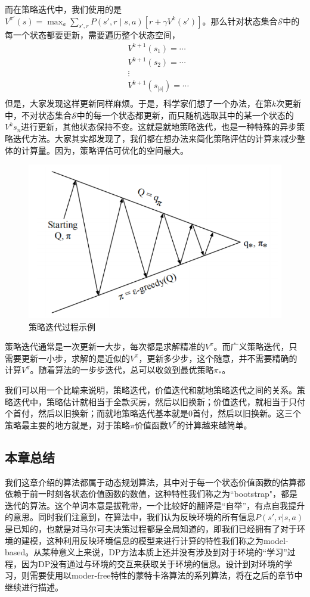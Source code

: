 \documentclass[a4paper]{article}
\begin{document}
而在策略迭代中，我们使用的是$V^{\pi'}(s) = \max_a \sum_{s',r} P(s',r\mid s,a)[r+\gamma V^{k}(s')]$。那么针对状态集合$\mathcal{S}$中的每一个状态都要更新，需要遍历整个状态空间，
\begin{equation}
    \begin{aligned}
    & V^{k+1}(s_1) = \cdots \\
    & V^{k+1}(s_2) = \cdots \\
    & \vdots \\
    & V^{k+1}(s_{|s|}) = \cdots \\
    \end{aligned}
\end{equation}
但是，大家发现这样更新同样麻烦。于是，科学家们想了一个办法，在第$k$次更新中，不对状态集合$\mathcal{S}$中的每一个状态都更新，而只随机选取其中的某一个状态的$V^k{s_n}$进行更新，其他状态保持不变。这就是就地策略迭代，也是一种特殊的异步策略迭代方法。大家其实都发现了，我们都在想办法来简化策略评估的计算来减少整体的计算量。因为，策略评估可优化的空间最大。
\begin{figure}[H]
    \centering
    \includegraphics[width=.55\textwidth]{微信图片_20200726205648.png}
    \caption{策略迭代过程示例}
    \label{fig:my_label_1}
\end{figure}
策略迭代通常是一次更新一大步，每次都是求解精准的$V^\pi$。而广义策略迭代，只需要更新一小步，求解的是近似的$V^\pi$，更新多少步，这个随意，并不需要精确的计算$V^\pi$。随着算法的一步步迭代，总可以收敛到最优策略$\pi_\ast$。

我们可以用一个比喻来说明，策略迭代，价值迭代和就地策略迭代之间的关系。策略迭代中，策略估计就相当于全款买房，然后以旧换新；价值迭代，就相当于只付个首付，然后以旧换新；而就地策略迭代基本就是0首付，然后以旧换新。这三个策略最主要的地方就是，对于策略$\pi$价值函数$V^\pi$的计算越来越简单。

\subsection{本章总结}
我们这章介绍的算法都属于动态规划算法，其中对于每一个状态价值函数的估算都依赖于前一时刻各状态价值函数的数值，这种特性我们称之为“bootstrap"，都是迭代的算法。这个单词本意是拔靴带，一个比较好的翻译是“自举”，有点自我提升的意思。同时我们注意到，在算法中，我们认为反映环境的所有信息$P(s',r|s,a)$ 是已知的，也就是对马尔可夫决策过程都是全局知道的，即我们已经拥有了对于环境的建模，这种利用反映环境信息的模型来进行计算的特性我们称之为model-based。从某种意义上来说，DP方法本质上还并没有涉及到对于环境的“学习”过程，因为DP没有通过与环境的交互来获取关于环境的信息。设计到对环境的学习，则需要使用以moder-free特性的蒙特卡洛算法的系列算法，将在之后的章节中继续进行描述。
\end{document}
